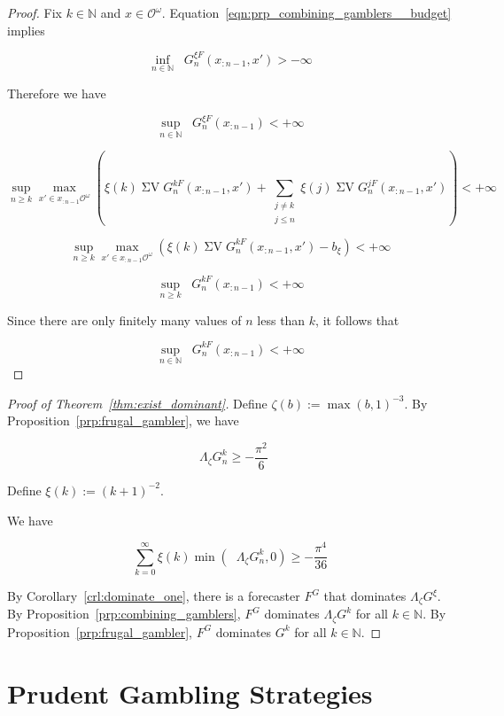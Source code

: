 \documentclass[11pt]{article}
\theoremstyle{definition}
\theoremstyle{plain}
\newcommand{\Nats}{\mathbb{N}}
\newcommand{\Ob}{\mathcal{O}}
\newcommand{\OO}{\Ob^\omega}
\DeclareMathOperator{\SV}{\Sigma V}
\DeclareMathOperator{\SVM}{\Sigma V_{\min}}
\DeclareMathOperator{\SVX}{\Sigma V_{\max}}
\newcommand{\Bd}{\Lambda}
\begin{document}
\begin{proof}

Fix $k \in \Nats$ and $x \in \OO$. Equation~\ref{eqn:prp_combining_gamblers__budget} implies

\[\inf_{n \in \Nats} \SVM G^{\xi F}_{n}\left(x_{:n-1},x'\right) > -\infty\]

Therefore we have

\[\sup_{n \in \Nats} \SVX G^{\xi F}_{n}\left(x_{:n-1}\right) < +\infty\]

\[\sup_{n \geq k} \max_{x' \in x_{:n-1}\OO} \left(\xi\left(k\right) \SV G^{k F}_{n}\left(x_{:n-1},x'\right) + \sum_{\substack{j \ne k\\ j \leq n}} \xi\left(j\right) \SV G^{j F}_{n}\left(x_{:n-1},x'\right)\right) < +\infty\]

\[\sup_{n \geq k} \max_{x' \in x_{:n-1}\OO} \left(\xi\left(k\right) \SV G^{k F}_{n}\left(x_{:n-1},x'\right) - b_\xi\right) < +\infty\]

\[\sup_{n \geq k} \SVX G^{k F}_{n}\left(x_{:n-1}\right) < +\infty\]

Since there are only finitely many values of $n$ less than $k$, it follows that

\[\sup_{n \in \Nats} \SVX G^{k F}_{n}\left(x_{:n-1}\right) < +\infty\]
\end{proof}

\begin{proof}[Proof of Theorem~\ref{thm:exist_dominant}]

Define $\zeta\left(b\right) := \max\left(b,1\right)^{-3}$. By Proposition~\ref{prp:frugal_gambler}, we have

\[\SVM \Bd_{\zeta} G^k_n \geq -\frac{\pi^2}{6}\]

Define $\xi\left(k\right):=\left(k+1\right)^{-2}$.

We have

\[\sum_{k=0}^\infty \xi\left(k\right) \min\left(\SVM \Bd_{\zeta} G^k_n, 0\right) \geq -\frac{\pi^4}{36} \]

By Corollary~\ref{crl:dominate_one}, there is a forecaster $F^G$ that dominates $\Bd_\zeta G^\xi$. By Proposition~\ref{prp:combining_gamblers}, $F^G$ dominates $\Bd_\zeta G^k$ for all $k \in \Nats$. By Proposition~\ref{prp:frugal_gambler}, $F^G$ dominates $G^k$ for all $k \in \Nats$.
\end{proof}

\section{Prudent Gambling Strategies}
\label{sec:prudent}
\end{document}
